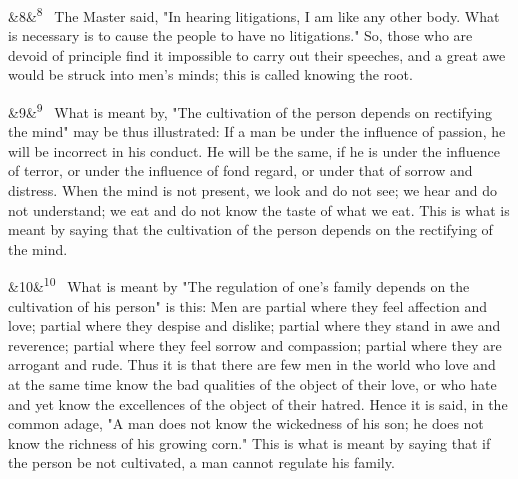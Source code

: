 \documentclass[12pt]{article}
\newcommand{\para}[1][]{\par\noindent\ifx&#1&\else\textsuperscript{\footnotesize #1}~\fi}
\begin{document}
\para[8] The Master said, "In hearing litigations, I am like any other body. What is necessary is to cause the people to have no litigations." So, those who are devoid of principle find it impossible to carry out their speeches, and a great awe would be struck into men's minds; this is called knowing the root.

\para[9] What is meant by, "The cultivation of the person depends on rectifying the mind" may be thus illustrated: If a man be under the influence of passion, he will be incorrect in his conduct. He will be the same, if he is under the influence of terror, or under the influence of fond regard, or under that of sorrow and distress. When the mind is not present, we look and do not see; we hear and do not understand; we eat and do not know the taste of what we eat. This is what is meant by saying that the cultivation of the person depends on the rectifying of the mind.

\para[10] What is meant by "The regulation of one's family depends on the cultivation of his person" is this: Men are partial where they feel affection and love; partial where they despise and dislike; partial where they stand in awe and reverence; partial where they feel sorrow and compassion; partial where they are arrogant and rude. Thus it is that there are few men in the world who love and at the same time know the bad qualities of the object of their love, or who hate and yet know the excellences of the object of their hatred. Hence it is said, in the common adage, "A man does not know the wickedness of his son; he does not know the richness of his growing corn." This is what is meant by saying that if the person be not cultivated, a man cannot regulate his family.
\end{document}
